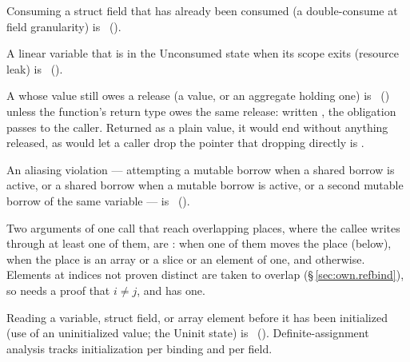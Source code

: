 \begin{constraint}
  Consuming a struct field that has already been consumed (a double-consume
  at field granularity) is \illformed{}~().
\end{constraint}

\begin{constraint}
  A linear variable that is in the Unconsumed state when its scope exits
  (resource leak) is \illformed{}~().
\end{constraint}

\begin{constraint}
  A  whose value still owes a release (a  value, or an
  aggregate holding one) is \illformed{}~() unless the
  function's return type owes the same release: written , the
  obligation passes to the caller.  Returned as a plain value, it would end
  without anything released, as 
  would let a caller drop the pointer that dropping directly is
  .
\end{constraint}

\begin{constraint}
  An aliasing violation — attempting a mutable borrow when a shared borrow
  is active, or a shared borrow when a mutable borrow is active, or a
  second mutable borrow of the same variable — is
  \illformed{}~().
\end{constraint}

\begin{constraint}
  Two arguments of one call that reach overlapping places, where the callee writes through at
  least one of them, are \illformed{}:  when one of them moves the place (below),
   when the place is an array or a slice or an element of one, and
   otherwise.  Elements at indices not proven distinct are taken to overlap
  (\S\,\ref{sec:own.refbind}), so  needs a proof that $i \neq j$,
  and  has one.
\end{constraint}

\begin{constraint}
  Reading a variable, struct field, or array element before it has been
  initialized (use of an uninitialized value; the Uninit state) is
  \illformed{}~().  Definite-assignment analysis tracks
  initialization per binding and per field.
\end{constraint}


